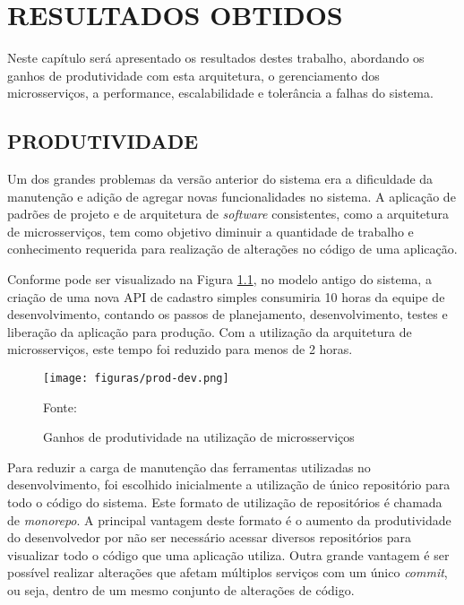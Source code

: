 \chapter{RESULTADOS OBTIDOS}
\label{chp:resultados}

Neste capítulo será apresentado os resultados destes trabalho, abordando os
ganhos de produtividade com esta arquitetura, o gerenciamento dos
microsserviços, a performance, escalabilidade e tolerância a falhas do sistema.

\section{PRODUTIVIDADE}

Um dos grandes problemas da versão anterior do sistema era a dificuldade da
manutenção e adição de agregar novas funcionalidades no sistema. A aplicação
de padrões de projeto e de arquitetura de \emph{software} consistentes,
como a arquitetura de microsserviços, tem como objetivo diminuir a quantidade
de trabalho e conhecimento requerida para realização de alterações no código
de uma aplicação.

Conforme pode ser visualizado na Figura \ref{fig:prod-dev}, no modelo antigo
do sistema, a criação de uma nova \ac{API} de cadastro simples consumiria
10 horas da equipe de desenvolvimento, contando os passos de planejamento,
desenvolvimento, testes e liberação da aplicação para produção. Com a
utilização da arquitetura de microsserviços, este tempo foi reduzido para
menos de 2 horas.

\begin{figure}[H]
	\centering
	\caption{Ganhos de produtividade na utilização de microsserviços}
	\texttt{[image: figuras/prod-dev.png]}

	\label{fig:prod-dev}
	\footnotesize Fonte: \fonteOAutor
\end{figure}

Para reduzir a carga de manutenção das ferramentas utilizadas no
desenvolvimento, foi escolhido inicialmente a utilização de único
repositório para todo o código do sistema. Este formato de utilização de
repositórios é chamada de \emph{monorepo}. A principal vantagem deste
formato é o aumento da produtividade do desenvolvedor por não ser necessário
acessar diversos repositórios para visualizar todo o código que uma aplicação
utiliza. Outra grande vantagem é ser possível realizar alterações que afetam
múltiplos serviços com um único \emph{commit}, ou seja, dentro de um mesmo
conjunto de alterações de código.

